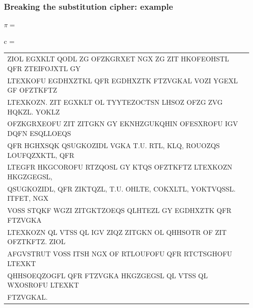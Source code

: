 \documentclass[aspectratio=169, lualatex, 10pt,dvipsnames,svgnames]{beamer} %
\def\enrouge#1{\textcolor{rouge}{#1}}
\begin{document}
\begin{frame}
  \frametitle{Breaking the substitution cipher: example}

  \enrouge{
    \tiny{$\pi=
      $}}
  \vspace{0.25cm}

  
  \color{vert}
  \tiny{c =
    \begin{tabular}[t]{l}
      ZIOL EGXKLT QODL ZG OFZKGRXET NGX ZG ZIT HKOFEOHSTL QFR ZTEIFOJXTL GY \\
      LTEXKOFU EGDHXZTKL QFR EGDHXZTK FTZVGKAL VOZI YGEXL GF OFZTKFTZ \\
      LTEXKOZN. ZIT EGXKLT OL TYYTEZOCTSN LHSOZ OFZG ZVG HQKZL. YOKLZ \\
      OFZKGRXEOFU ZIT ZITGKN GY EKNHZGUKQHIN OFESXROFU IGV DQFN ESQLLOEQS \\
      QFR HGHXSQK QSUGKOZIDL VGKA T.U. RTL, KLQ, ROUOZQS LOUFQZXKTL, QFR \\
      LTEGFR HKGCOROFU RTZQOSL GY KTQS OFZTKFTZ LTEXKOZN HKGZGEGSL, \\
      QSUGKOZIDL, QFR ZIKTQZL, T.U. OHLTE, COKXLTL, YOKTVQSSL. ITFET, NGX \\
      VOSS STQKF WGZI ZITGKTZOEQS QLHTEZL GY EGDHXZTK QFR FTZVGKA \\
      LTEXKOZN QL VTSS QL IGV ZIQZ ZITGKN OL QHHSOTR OF ZIT OFZTKFTZ. ZIOL \\
      AFGVSTRUT VOSS ITSH NGX OF RTLOUFOFU QFR RTCTSGHOFU LTEXKT \\
      QHHSOEQZOGFL QFR FTZVGKA HKGZGEGSL QL VTSS QL WXOSROFU LTEXKT \\
      FTZVGKAL.
    \end{tabular}
  }
  \vspace{0.5cm}

  \normalsize
  \color{black}{Most common letters in c: t $>$ z $>$ o $>$ l}
\end{frame}
\end{document}
